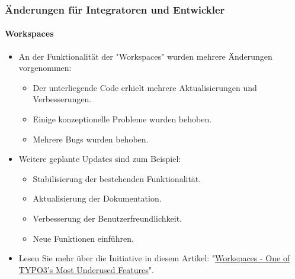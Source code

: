 %

\begin{frame}[fragile]
	\frametitle{Änderungen für Integratoren und Entwickler}
	\framesubtitle{Workspaces}

	\begin{itemize}
		\item An der Funktionalität der "Workspaces" wurden mehrere Änderungen vorgenommen:

			\begin{itemize}
				\item Der unterliegende Code erhielt mehrere Aktualisierungen und Verbesserungen.
				\item Einige konzeptionelle Probleme wurden behoben.
				\item Mehrere Bugs wurden behoben.
			\end{itemize}

		\item Weitere geplante Updates sind zum Beispiel:

			\begin{itemize}
				\item Stabilisierung der bestehenden Funktionalität.
				\item Aktualisierung der Dokumentation.
				\item Verbesserung der Benutzerfreundlichkeit.
				\item Neue Funktionen einführen.
			\end{itemize}

		\item Lesen Sie mehr über die Initiative in diesem Artikel:\newline
			"\href{https://typo3.org/article/workspaces-one-of-typo3s-most-underused-features}{Workspaces - One of TYPO3's Most Underused Features}".

	\end{itemize}

\end{frame}

